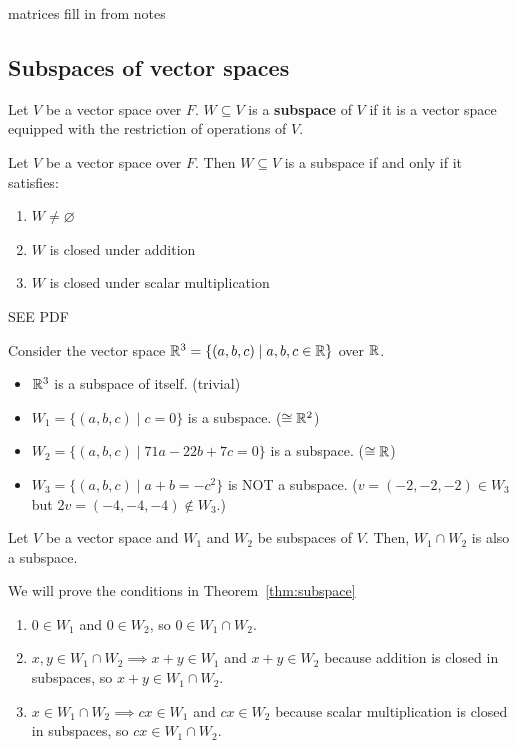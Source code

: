 \documentclass[12pt]{article}
\begin{document}
\begin{defn}
    matrices fill in from notes
\end{defn}

\subsection{Subspaces of vector spaces}
\begin{defn}
    Let $V$ be a vector space over $F$. $W \subseteq V$ is a \textbf{subspace} of $V$ if it is a vector space equipped with the restriction of operations of $V$.
\end{defn}

\begin{thm}\label{thm:subspace}
    Let $V$ be a vector space over $F$. Then $W \subseteq V$ is a subspace if and only if it satisfies:
    \begin{enumerate}[label=(\roman*)]
        \item $W \neq \varnothing$
        \item $W$ is closed under addition
        \item $W$ is closed under scalar multiplication
    \end{enumerate}
\end{thm}
\begin{pf}
    SEE PDF
\end{pf}
\begin{ex}
    Consider the vector space $\mathbb{R}^3 = \{ (a,b,c) \mid a,b,c \in \mathbb{R} \}$ over $\mathbb{R}$.
    \begin{itemize}
        \item $\mathbb{R}^3$ is a subspace of itself. (trivial)
        \item $W_{1} = \{ (a,b,c) \mid c=0 \}$ is a subspace. ($\cong\mathbb{R}^2$)
        \item $W_{2} = \{ (a,b,c) \mid 71a-22b+7c = 0 \}$ is a subspace. ($\cong\mathbb{R}$)
        \item $W_{3} = \{ (a,b,c) \mid a+b=-c^{2} \}$ is NOT a subspace. ($v = (-2,-2,-2) \in W_{3}$ but $2v = (-4,-4,-4) \not\in W_{3}$.)
    \end{itemize}
\end{ex}

\begin{thm}
    Let $V$ be a vector space and $W_{1}$ and $W_{2}$ be subspaces of $V$. Then, $W_{1} \cap W_{2}$ is also a subspace.
\end{thm}
\begin{pf}
    We will prove the conditions in Theorem~\ref{thm:subspace}
    \begin{enumerate}[label=(\roman*)]
        \item $0 \in W_{1}$ and $0 \in W_{2}$, so $0 \in W_{1} \cap W_{2}$.
        \item $x, y \in W_{1} \cap W_{2} \implies x+y \in W_{1}$ and $x+y \in W_{2}$ because addition is closed in subspaces, so $x+y \in W_{1} \cap W_{2}$.
        \item $x \in W_{1} \cap W_{2} \implies cx \in W_{1}$ and $cx \in W_{2}$ because scalar multiplication is closed in subspaces, so $cx \in W_{1} \cap W_{2}$. \qedhere
    \end{enumerate}
\end{pf}
\end{document}
